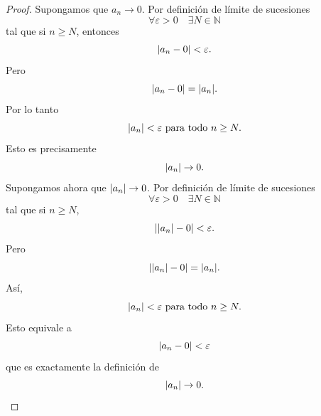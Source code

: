 \documentclass[12pt,a4paper]{article}
\begin{document}
    \begin{proof}
        Supongamos que $a_{n}\to0$. Por definición de límite de sucesiones
        \begin{equation*}
            \forall\varepsilon\gt0\quad\exists N\in\mathbb{N}
        \end{equation*}
        tal que si $n\geq N$, entonces
        \begin{equation*}
            \abs{a_{n}-0}<\varepsilon.
        \end{equation*}
        Pero
        \begin{equation*}
            \abs{a_{n}-0}=\abs{a_{n}}.
        \end{equation*}
        Por lo tanto
        \begin{equation*}
            \abs{a_{n}}<\varepsilon\text{ para todo }n\geq N.
        \end{equation*}
        Esto es precisamente
        \begin{equation*}
            \abs{a_{n}}\to0.
        \end{equation*}
        Supongamos ahora que $\abs{a_{n}}\to0$. Por definición de límite de sucesiones
        \begin{equation*}
            \forall\varepsilon\gt0\quad\exists N\in\mathbb{N}
        \end{equation*}
        tal que si $n\geq N$,
        \begin{equation*}
            \abs{\abs{a_{n}}-0}<\varepsilon.
        \end{equation*}
        Pero
        \begin{equation*}
            \abs{\abs{a_{n}}-0}=\abs{a_{n}}.
        \end{equation*}
        Así,
        \begin{equation*}
            \abs{a_{n}}<\varepsilon\text{ para todo }n\geq N.
        \end{equation*}
        Esto equivale a
        \begin{equation*}
            \abs{a_{n}-0}<\varepsilon
        \end{equation*}
        que es exactamente la definición de
        \begin{equation*}
            \abs{a_{n}}\to0.
        \end{equation*}
    \end{proof}
\end{document}
